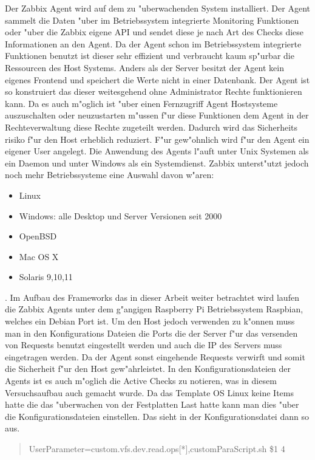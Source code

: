 Der Zabbix Agent wird auf dem zu "uberwachenden System installiert. Der Agent sammelt die Daten "uber im Betriebssystem %
integrierte Monitoring Funktionen oder "uber die Zabbix eigene API und sendet diese je nach Art des Checks diese Informationen an den Agent. %
Da der Agent schon im Betriebssystem integrierte Funktionen benutzt ist dieser sehr effizient und verbraucht kaum sp"urbar %
die Ressourcen des Host Systems. Anders als der Server besitzt der Agent kein eigenes Frontend und speichert die Werte nicht %
in einer Datenbank. Der Agent ist so konstruiert das dieser weitesgehend ohne Administrator Rechte funktionieren kann. %
Da es auch m"oglich ist "uber einen Fernzugriff Agent Hostsysteme auszuschalten oder neuzustarten m"ussen f"ur diese Funktionen %
dem Agent in der Rechteverwaltung diese Rechte zugeteilt werden. Dadurch wird das Sicherheits%
risiko f"ur den Host erheblich reduziert. F"ur gew"ohnlich wird f"ur den Agent ein eigener User angelegt. Die Anwendung des Agents %
l"auft unter Unix Systemen als ein Daemon und unter Windows als ein Systemdienst. Zabbix unterst"utzt jedoch noch mehr %
Betriebssysteme eine Auswahl davon w"aren: 
\begin{itemize}
\item Linux
\item Windows: alle Desktop und Server Versionen seit 2000
\item OpenBSD
\item Mac OS X
\item Solaris 9,10,11
\end{itemize}
\autocite{zabbix:agent}.
Im Aufbau des Frameworks das in dieser Arbeit weiter betrachtet wird laufen die Zabbix Agents unter dem g"angigen Raspberry Pi %
Betriebssystem Raspbian, welches ein Debian Port ist. Um den Host jedoch verwenden zu k"onnen muss man in %
den Konfigurations Dateien die Ports die der Server f"ur das versenden von Requests benutzt eingestellt werden und auch die IP des Servers %
muss eingetragen werden. Da der Agent sonst eingehende Requests verwirft und somit die Sicherheit f"ur den Host gew"ahrleistet. %
In den Konfigurationsdateien der Agents ist es auch m"oglich %
die Active Checks zu notieren, was in diesem Versuchsaufbau auch gemacht wurde. Da das Template OS Linux keine Items hatte die das %
"uberwachen von der Festplatten Last hatte kann man dies "uber die Konfigurationsdateien einstellen. Das sieht in der Konfigurationsdatei %
dann so aus.
\begin{quote}

UserParameter=custom.vfs.dev.read.ops[*],customParaScript.sh \$1 4 

\end{quote}

